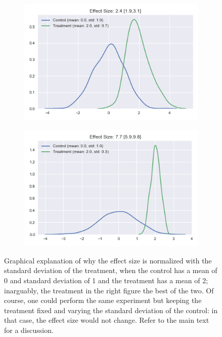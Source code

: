 \documentclass[a4paper]{book}
\begin{document}
\begin{figure}
    \centering
    \begin{subfigure}[t]{0.49\textwidth}
        \centering
        \includegraphics[width=\textwidth]{images/small_es}
        \label{fig:small_es}
    \end{subfigure}
    \hfill
    \begin{subfigure}[t]{0.49\textwidth}
        \centering
        \includegraphics[width=\textwidth]{images/large_es}
		\label{fig:large_es}
    \end{subfigure}
    \caption{Graphical explanation of why the effect size is normalized with the standard deviation of the treatment, when the control has a mean of 0 and standard deviation of 1 and the treatment has a mean of 2; inarguably, the treatment in the right figure the best of the two. Of course, one could perform the same experiment but keeping the treatment fixed and varying the standard deviation of the control: in that case, the effect size would not change. Refer to the main text for a discussion.}
	\label{fig:effect_size}
\end{figure}
\end{document}
